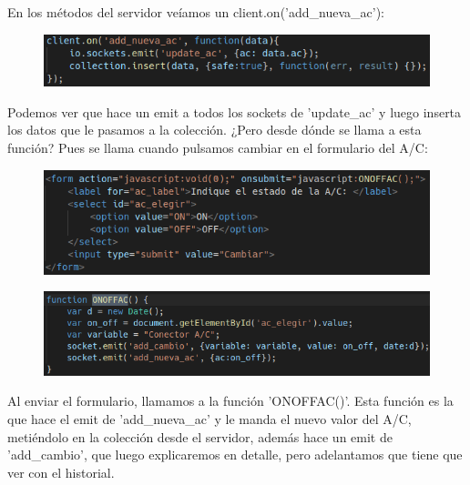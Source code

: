 \documentclass{article}
\begin{document}
	En los métodos del servidor veíamos un client.on('add\_nueva\_ac'):
	\begin{figure}[H]
		\centering
		\includegraphics[totalheight=1.65cm]{img/11.png}
	\end{figure}
	Podemos ver que hace un emit a todos los sockets de 'update\_ac' y luego inserta los datos que le pasamos a la colección. ¿Pero desde dónde se llama a esta función? Pues se llama cuando pulsamos cambiar en el formulario del A/C:
	\begin{figure}[H]
		\centering
		\includegraphics[totalheight=3.3cm]{img/12.png}
	\end{figure}
	\begin{figure}[H]
		\centering
		\includegraphics[totalheight=2.7cm]{img/13.png}
	\end{figure}
	Al enviar el formulario, llamamos a la función 'ONOFFAC()'. Esta función es la que hace el emit de 'add\_nueva\_ac' y le manda el nuevo valor del A/C, metiéndolo en la colección desde el servidor, además hace un emit de 'add\_cambio', que luego explicaremos en detalle, pero adelantamos que tiene que ver con el historial.
	
\end{document}
